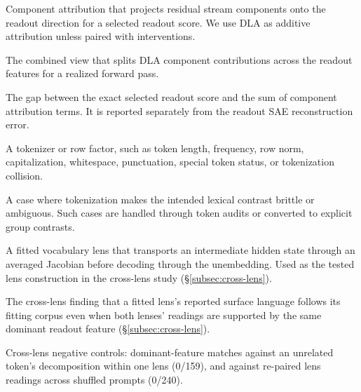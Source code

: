 \begin{description}[leftmargin=0.28\linewidth,style=nextline]
    \item[Direct logit attribution, DLA]
    Component attribution that projects residual stream components onto the
    readout direction for a selected readout score. We use DLA as additive attribution
    unless paired with interventions.

    \item[Feature-resolved DLA]
    The combined view that splits DLA component contributions across the
    readout features for a realized forward pass.

    \item[Additivity error]
    The gap between the exact selected readout score and the sum of component attribution
    terms. It is reported separately from the readout SAE reconstruction error.

    \item[Token audit item]
    A tokenizer or row factor, such as token length, frequency, row norm,
    capitalization, whitespace, punctuation, special token status, or
    tokenization collision.

    \item[Tokenization collision]
    A case where tokenization makes the intended lexical contrast brittle or
    ambiguous. Such cases are handled through token audits or converted
    to explicit group contrasts.

    \item[Jacobian lens]
    A fitted vocabulary lens \citep{gurnee2026workspace} that transports
    an intermediate hidden state through an averaged Jacobian before
    decoding through the unembedding. Used as the tested lens
    construction in the cross-lens study (\S\ref{subsec:cross-lens}).

    \item[Corpus conditionality]
    The cross-lens finding that a fitted lens's reported surface language
    follows its fitting corpus even when both lenses' readings are
    supported by the same dominant readout feature
    (\S\ref{subsec:cross-lens}).

    \item[Unrelated-token / shuffled-pairing controls]
    Cross-lens negative controls: dominant-feature matches against an
    unrelated token's decomposition within one lens (0/159), and against
    re-paired lens readings across shuffled prompts (0/240).
\end{description}
